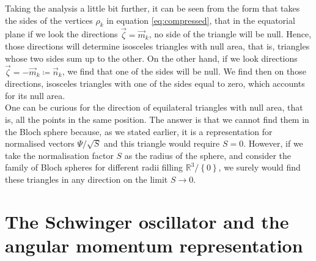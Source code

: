 Taking the analysis a little bit further, it can be seen from the form that takes the sides of the vertices $\rho_k$ in equation \eqref{eq:compressed}, that in the equatorial plane if we look the directions $\vec{\zeta} = \vec{m}_k$, no side of the triangle will be null. Hence, those directions will determine isosceles triangles with null area, that is, triangles whose two sides sum up to the other. On the other hand, if we look directions $\vec{\zeta} = -\vec{m}_k \coloneqq \vec{n}_k$, we find that one of the sides will be null. We find then on those directions, isosceles triangles with one of the sides equal to zero, which accounts for its null area.\\

One can be curious for the direction of equilateral triangles with null area, that is, all the points in the same position.  The answer is that we cannot find them in the Bloch sphere because, as we stated earlier, it is a representation for normalised vectors $\Psi/\sqrt{S}$ and this triangle would require $S=0$. However, if we take the normalisation factor $S$ as the radius of the sphere, and consider the family of Bloch spheres for different radii filling $\mathbb{R}^3/\left\{0\right\}$, we surely would find these triangles in any direction on the limit $S\to 0$.\\

\section{The Schwinger oscillator and the angular momentum representation}
